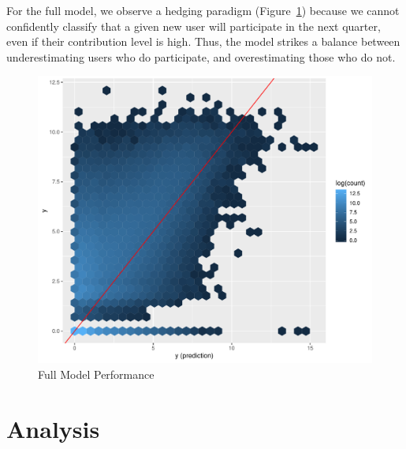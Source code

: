 \documentclass[letterpaper, 12pt, conference]{ieeeconf}
\begin{document}
For the full model, we observe a hedging paradigm (Figure~\ref{fig:hedging}) because we cannot confidently classify that a given new user will participate in the next quarter, even if their contribution level is high. Thus, the model strikes a balance between underestimating users who do participate, and overestimating those who do not.
\begin{figure}[ht]
    \centering
    \includegraphics[width=1\linewidth]{reg_full.pdf}
    \caption{Full Model Performance}
    \label{fig:hedging}
\end{figure}

\section{Analysis}
\end{document}
